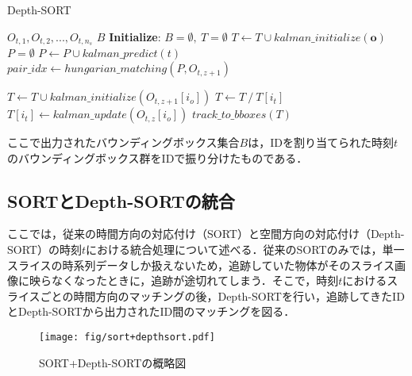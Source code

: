 \begin{algorithm}[t]
    \caption{Depth-SORT}
    \label{alg:Depth-SORT}
    \begin{algorithmic}[1]
        \REQUIRE $O_{t,1}, O_{t,2}, ..., O_{t,n_s}$
        \ENSURE $B$ 
        \STATE \textbf{Initialize}: $B = \emptyset,\ T = \emptyset$
            \STATE $T \leftarrow T \cup kalman\_initialize(\bm{o})$ 
        \ENDFOR
            \STATE $P = \emptyset$ 
                \STATE $P \leftarrow P \cup kalman\_predict(t)$ 
            \ENDFOR
            \STATE $pair\_idx \leftarrow hungarian\_matching(P, O_{t,z+1})$ 

                \STATE $T \leftarrow T \cup kalman\_initialize(O_{t,z+1}[i_o])$ 
                \STATE $T \leftarrow T\ /\ T[i_t]$ 
            \ELSE 
                \STATE $T[i_t] \leftarrow kalman\_update(O_{t,z}[i_o])$ 
            \ENDIF
    \ENDFOR
        \ENDFOR
        \RETURN $track\_to\_bboxes(T)$
    \end{algorithmic}
\end{algorithm}

ここで出力されたバウンディングボックス集合$B$は，IDを割り当てられた時刻$t$のバウンディングボックス群をIDで振り分けたものである．

\subsection{SORTとDepth-SORTの統合}
ここでは，従来の時間方向の対応付け（SORT）と空間方向の対応付け（Depth-SORT）の時刻$t$における統合処理について述べる．従来のSORTのみでは，単一スライスの時系列データしか扱えないため，追跡していた物体がそのスライス画像に映らなくなったときに，追跡が途切れてしまう．そこで，時刻$t$におけるスライスごとの時間方向のマッチングの後，Depth-SORTを行い，追跡してきたIDとDepth-SORTから出力されたID間のマッチングを図る．

\begin{figure}[t]
    \centering
    \texttt{[image: fig/sort+depthsort.pdf]}
    \caption{SORT+Depth-SORTの概略図}
    \label{fig:sort+depthsort}
\end{figure}

